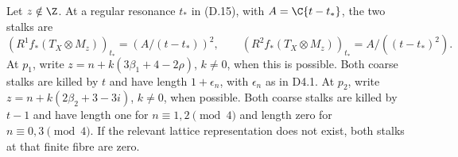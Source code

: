 \begin{proposition}\label{inv:D4.4}
Let $z\notin\Z$. At a regular resonance $t_*$ in (D.15), with
$A=\C\{t-t_*\}$, the two stalks are
\[
 (R^1f_*(T_X\otimes M_z))_{t_*}=(A/(t-t_*))^2,
 \qquad (R^2f_*(T_X\otimes M_z))_{t_*}=A/((t-t_*)^2).    \tag{D.18}
\]
At $p_1$, write $z=n+k(3\beta_1+4-2\rho)$, $k\ne0$, when this is
possible. Both coarse stalks are killed by $t$ and have length
$1+\epsilon_n$, with $\epsilon_n$ as in D4.1.
At $p_2$, write $z=n+k(2\beta_2+3-3i)$, $k\ne0$, when possible.
Both coarse stalks are killed by $t-1$ and have length one for
$n\equiv1,2\pmod4$ and length zero for $n\equiv0,3\pmod4$.
If the relevant lattice representation does not exist, both stalks
at that finite fibre are zero.
\end{proposition}
